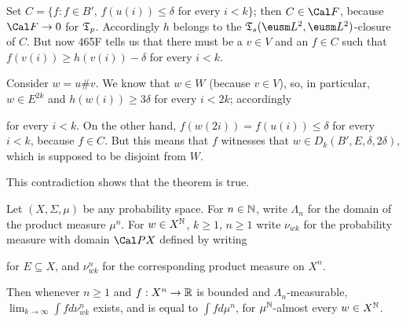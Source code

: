 {\noindent Set $C=\{f:f\in B',\,f(u(i))\le\delta$ for every $i<k\}$;  then
$C\in\Cal F$, because $\Cal F\to 0$ for $\frak T_p$.   Accordingly $h$
belongs to the $\frak T_s(\eusm L^2,\eusm L^2)$-closure of $C$.   But
now 465F tells us that there must be a $v\in V$ and an $f\in C$ such
that $f(v(i))\ge h(v(i))-\delta$ for every $i<k$.

Consider $w=u\#v$.   We know that $w\in W$
(because $v\in V$), so, in particular, $w\in E^{2k}$ and
$h(w(i))\ge 3\delta$ for every $i<2k$;  accordingly


\noindent for every $i<k$.   On the other hand,
$f(w(2i))=f(u(i))\le\delta$ for every $i<k$, because $f\in C$.   But this
means that $f$ witnesses that $w\in D_k(B',E,\delta,2\delta)$, which is
supposed to be disjoint from $W$.\ \Bang

This contradiction shows that the theorem is true.
}%

 Let $(X,\Sigma,\mu)$ be any probability space.
For $n\in\Bbb N$, write $\Lambda_n$ for the domain of the product
measure $\mu^n$.    For $w\in X^{\Bbb N}$, $k\ge 1$, $n\ge 1$ write
$\nu_{wk}$ for the probability measure with domain $\Cal PX$ defined by
writing


\noindent for $E\subseteq X$, and $\nu_{wk}^n$ for the corresponding
product measure on $X^n$.

Then whenever $n\ge 1$ and $f:X^n\to\Bbb R$ is bounded and
$\Lambda_n$-measurable, $\lim_{k\to\infty}\int fd\nu_{wk}^n$ exists, and
is equal to $\int fd\mu^n$, for $\mu^{\Bbb N}$-almost every
$w\in X^{\Bbb N}$.

